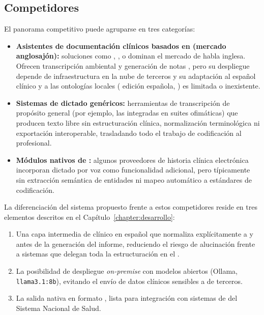 \subsection{Competidores}\label{section:innovacion_competidores}

El panorama competitivo puede agruparse en tres categorías:

\begin{itemize}
    \item \textbf{Asistentes de documentación clínicos basados en  (mercado anglosajón):}
    soluciones como , ,
     o  dominan el mercado de habla inglesa. Ofrecen
    transcripción ambiental y generación de notas , pero su despliegue depende de
    infraestructura en la nube de terceros y su adaptación al español clínico y a las ontologías
    locales ( edición española, ) es limitada o
    inexistente.
    \item \textbf{Sistemas de dictado genéricos:} herramientas de transcripción de propósito general
    (por ejemplo, las integradas en suites ofimáticas) que producen texto libre sin estructuración
    clínica, normalización terminológica ni exportación interoperable, trasladando todo el trabajo de
    codificación al profesional.
    \item \textbf{Módulos nativos de :} algunos proveedores de historia clínica
    electrónica incorporan dictado por voz como funcionalidad adicional, pero típicamente sin
    extracción semántica de entidades ni mapeo automático a estándares de codificación.
\end{itemize}

La diferenciación del sistema propuesto frente a estos competidores reside en tres elementos descritos
en el Capítulo~\ref{chapter:desarrollo}: 
\begin{enumerate}
\item Una capa intermedia de  clínico en
español que normaliza explícitamente a  y  antes de la
generación del informe, reduciendo el riesgo de alucinación frente a sistemas que delegan toda la
estructuración en el .
\item La posibilidad de despliegue \textit{on-premise} con
modelos abiertos (Ollama, \texttt{llama3.1:8b}), evitando el envío de datos clínicos sensibles a
 de terceros.
\item La salida nativa en formato , lista para
integración con sistemas de  del Sistema Nacional de Salud.
\end{enumerate}

